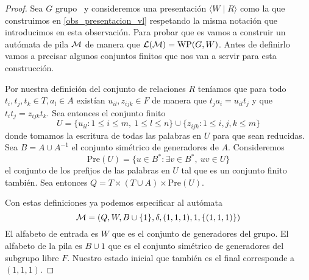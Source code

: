 \documentclass[tesis.tex]{subfiles}
\begin{document}
\begin{proof}
	Sea $G$ grupo \vl  \ y consideremos una presentación $\langle W  \mid  R \rangle$ como la que construimos en \ref{obs_presentacion_vl} respetando la misma notación que introducimos en esta observación.
	Para probar que es \ic vamos a construir un autómata de pila $\cal M$ de manera que  $ {\cal L(M)}= \text{WP}(G,W)$.
	Antes de definirlo vamos a precisar algunos conjuntos finitos que nos van a servir para esta construcción.
	
	Por nuestra definición del conjunto de relaciones $R$ teníamos que para todo $t_{i}, t_{j}, t_{k} \in T, a_{l} \in A$ existían $u_{il}, z_{ijk} \in F$ de manera que 
	$t_j a_i = u_{il} t_j $ y que $ t_it_j = z_{ijk}t_k $. 
	Sea entonces el conjunto finito 
	\[
		U =  \{u_{il} : 1 \le i \le m, \ 1 \le l \le n \}  \cup  \{z_{ijk} : 1 \le i,j,k \le m\} 
	\]
	donde tomamos la escritura de todas las palabras en $U$ para que sean reducidas.
	Sea $B = A \cup A^{-1}$ el conjunto simétrico de generadores de $A$.
	Consideremos 
	\[
		\text{Pre}(U) = \{ u \in B^* : \exists v \in B^*, \  uv \in U  \}
	\]
	el conjunto de los prefijos de las palabras en $U$  tal que es un conjunto finito también.
	Sea entonces $Q = T \times (T \cup A) \times \text{Pre}(U)$.
	
	Con estas definiciones ya podemos especificar al autómata
	\[
	{\cal M }= (Q, W , B \cup \{ 1 \}, \delta, (1,1,1), 1 ,\{(1,1,1)\})
	\]
	El alfabeto de entrada es $W$ que es el conjunto de generadores del grupo.
	El alfabeto de la pila es $B \cup 1$ que es el conjunto simétrico de generadores del subgrupo libre $F$.
	Nuestro estado inicial que también es el final corresponde a $(1,1,1)$.
	

\end{proof}
\end{document}
